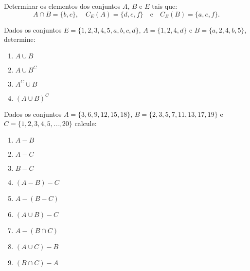 \documentclass[12pt]{article}
\begin{document}
\vspace{.3cm}

\questao Determinar os elementos dos conjuntos $A$, $B$ e $E$ tais que:
\[
	A \cap B = \{b, c\}, \quad C_E(A) = \{d, e, f\} \quad \mbox{e}\quad C_E(B) = \{a, e, f\}.
\]

\vspace{.3cm}

\questao Dados os conjuntos $E = \{1,2,3,4,5,a,b,c,d\}$, $A = \{1,2,4,d\}$ e $B = \{a,2,4,b,5\}$, determine:
\begin{multicols}{2}
	\begin{enumerate}[label={\alph*})]
		\item $A \cup B$
		\item $A \cup B^C$
		\item $A^C \cup B$
		\item $(A \cup B)^C$
	\end{enumerate}
\end{multicols}

\vspace{.3cm}

\questao Dados os conjuntos $A = \{3,6,9,12,15,18\}$, $B = \{2,3,5,7,11,13,17,19\}$ e $C = \{1,2,3,4,5,\dots,20\}$ calcule:
\begin{multicols}{3}
	\begin{enumerate}[label={\alph*})]
		\item $A - B$
		\item $A - C$
		\item $B - C$
		\item $(A - B) - C$
		\item $A - (B - C)$
		\item $(A \cup B) - C$
		\item $A - (B \cap C)$
		\item $(A \cup C) - B$
		\item $(B \cap C) - A$
	\end{enumerate}
\end{multicols}

\vspace{.3cm}
\end{document}
